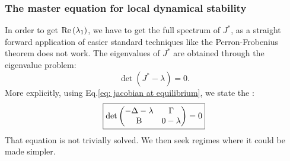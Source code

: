 \documentclass[12pt, titlepage]{report}
\begin{document}
\subsubsection{The master equation for local dynamical stability}
In order to get $\text{Re}\left(\lambda_1\right)$, we have to get the full spectrum of $J^*$, as a straight forward application of easier standard techniques like the Perron-Frobenius theorem \cite{perron_zur_nodate} does not work. The eigenvalues of $J^*$ are obtained through the eigenvalue problem:
\begin{equation}
\det\left(J^* - \lambda \right) = 0.
\end{equation}
More explicitly, using Eq.\eqref{eq: jacobian at equilibrium}, we state the :
\begin{equation}
\boxed{
\det
\begin{pmatrix}
 -\Delta - \lambda  & \Gamma \\
 \text{B} & 0-\lambda
\end{pmatrix} = 0
}\label{eq: master equation eigenvalues jacobian}
\end{equation}
That equation is not trivially solved. We then seek regimes where it could be made simpler.
\end{document}
